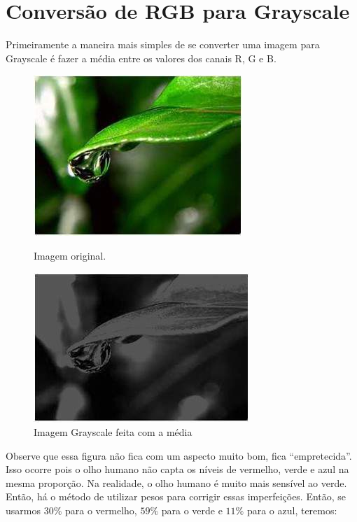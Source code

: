 \documentclass[a4paper, 12pt]{article}
\begin{document}
\section{Conversão de RGB para Grayscale}
Primeiramente a maneira mais simples de se converter uma imagem para Grayscale é fazer a média entre os valores dos canais R, G e B.
\begin{figure}[!htb]
	\centering
	  \includegraphics[width=\linewidth]{images/rgb.jpg}
	  \caption{Imagem original.}
	\endminipage\hspace{1cm}
	  \includegraphics[width=\linewidth]{images/avg_gray.jpg}
	  \caption{Imagem Grayscale feita com a média}
	\endminipage
\end{figure}
Observe que essa figura não fica com um aspecto muito bom, fica ``empretecida''. Isso ocorre pois o olho humano não capta os níveis 
de vermelho, verde e azul na mesma proporção. Na realidade, o olho humano é muito mais sensível ao verde. Então, há o método de utilizar pesos para 
corrigir essas imperfeições. Então, se usarmos $30\%$ para o vermelho, $59\%$ para o verde e $11\%$ para o azul, teremos:
\end{document}
